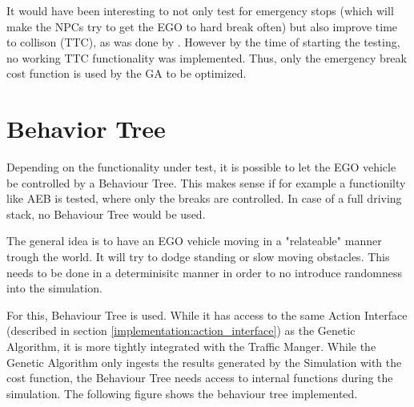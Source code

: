 It would have been interesting to not only test for emergency stops (which will make the NPCs try to get the EGO to hard break often) but also improve time to collison (TTC), as was done by . However by the time of starting the testing, no working TTC functionality was implemented. Thus, only the emergency break cost function is used by the GA to be optimized.


\section{Behavior Tree}
Depending on the functionality under test, it is possible to let the EGO vehicle be controlled by a Behaviour Tree. This makes sense if for example a functionilty like AEB is tested, where only the breaks are controlled. In case of a full driving stack, no Behaviour Tree would be used.

The general idea is to have an EGO vehicle moving in a "relateable" manner trough the world. It will try to dodge standing or slow moving obstacles. This needs to be done in a determinisitc manner in order to no introduce randomness into the simulation.

For this, Behaviour Tree is used. While it has access to the same Action Interface (described in section \ref{implementation:action_interface}) as the Genetic Algorithm, it is more tightly integrated with the Traffic Manger. While the Genetic Algorithm only ingests the results generated by the Simulation with the cost function, the Behaviour Tree needs access to internal functions during the simulation. The following figure shows the behaviour tree implemented.


